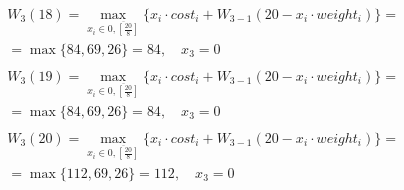 \documentclass[17pt]{extarticle}
\begin{document}
\[
    \begin{aligned}
         & W_3(18)=\max_{x_i \in \overline{0, \left[\frac{20}{8}\right]}} \{x_i \cdot cost_i + W_{3-1}(20 - x_i \cdot weight_i)\}= \\& = \max \{
        84, 69, 26\}= 84, \quad x_3 = 0                                                                                            \\
    \end{aligned}
\]
\[
    \begin{aligned}
         & W_3(19)=\max_{x_i \in \overline{0, \left[\frac{20}{8}\right]}} \{x_i \cdot cost_i + W_{3-1}(20 - x_i \cdot weight_i)\}= \\& = \max \{
        84, 69, 26\}= 84, \quad x_3 = 0                                                                                            \\
    \end{aligned}
\]
\[
    \begin{aligned}
         & W_3(20)=\max_{x_i \in \overline{0, \left[\frac{20}{8}\right]}} \{x_i \cdot cost_i + W_{3-1}(20 - x_i \cdot weight_i)\}= \\& = \max \{
        112, 69, 26\}= 112, \quad x_3 = 0                                                                                          \\
    \end{aligned}
\]
\end{document}
